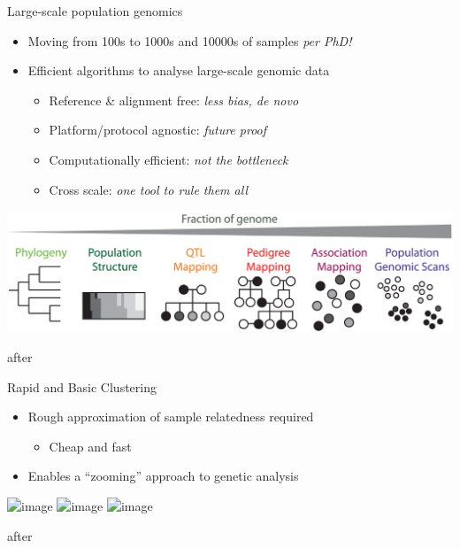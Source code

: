 \documentclass[t]{beamer}
\begin{document}
\begin{frame}{Large-scale population genomics}
  \begin{itemize}
    \item Moving from 100s to 1000s and 10000s of samples \textit{per PhD!}
      \pause
    \item Efficient algorithms to analyse large-scale genomic data
    \begin{itemize}
      \item Reference \& alignment free: \textit{less bias, de novo}
      \item Platform/protocol agnostic: \textit{future proof}
      \item Computationally efficient: \textit{not the bottleneck}
      \item Cross scale: \textit{one tool to rule them all}
    \end{itemize}
  \end{itemize}
  \begin{center}
    \includegraphics[width=\textwidth]{img/cross-scale.png}
  \end{center}
  \tiny{after \textcite{peterson_double_2012}}
\end{frame}


\begin{frame}{Rapid and Basic Clustering}
  \begin{itemize}
    \item Rough approximation of sample relatedness required
      \begin{itemize}
        \item Cheap and fast
      \end{itemize}
    \item Enables a ``zooming'' approach to genetic analysis
  \end{itemize}
  \begin{center}
    \includegraphics<1>[width=\textwidth]{img/restruct-1}
    \includegraphics<2>[width=\textwidth]{img/restruct-2}
    \includegraphics<3>[width=\textwidth]{img/restruct-3}
  \end{center}
  \tiny{after \textcite{brachi_genome-wide_2011}}
\end{frame}
\end{document}
